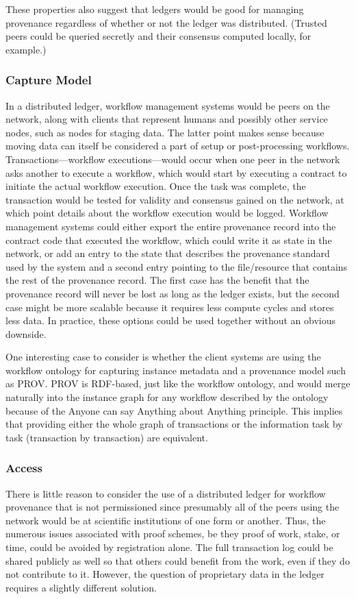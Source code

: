 These properties also suggest that ledgers would be good for managing provenance
regardless of whether or not the ledger was distributed. (Trusted peers could be
queried secretly and their consensus computed locally, for example.)

\subsubsection{Capture Model}
In a distributed ledger, workflow management systems would be peers on the
network, along with clients that represent humans and possibly other service
nodes, such as nodes for staging data. The latter point makes sense because
moving data can itself be considered a part of setup or post-processing
workflows. Transactions---workflow executions---would occur when one peer in the
network asks another to execute a workflow, which would start by executing a
contract to initiate the actual workflow execution. Once the task was complete,
the transaction would be tested for validity and consensus gained on the
network, at which point details about the workflow execution would be logged.
Workflow management systems could either export the entire provenance record
into the contract code that executed the workflow, which could write it as state
in the network, or add an entry to the state that describes the provenance
standard used by the system and a second entry pointing to the file/resource
that contains the rest of the provenance record. The first case has the benefit
that the provenance record will never be lost as long as the ledger exists, but
the second case might be more scalable because it requires less compute cycles
and stores less data. In practice, these options could be used together without
an obvious downside.

One interesting case to consider is whether the client systems are using the
workflow ontology for capturing instance metadata and a provenance model such
as PROV. PROV is RDF-based, just like the workflow ontology, and would merge
naturally into the instance graph for any workflow described by the ontology
because of the Anyone can say Anything about Anything principle. This implies
that providing either the whole graph of transactions or the information task by
task (transaction by transaction) are equivalent.

\subsubsection{Access}
There is little reason to consider the use of a distributed ledger for workflow
provenance that is not permissioned since presumably all of the peers using the
network would be at scientific institutions of one form or another. Thus, the
numerous issues associated with proof schemes, be they proof of work, stake, or
time, could be avoided by registration alone. The full transaction log could be
shared publicly as well so that others could benefit from the work, even if they
do not contribute to it. However, the question of proprietary data in the ledger
requires a slightly different solution.

